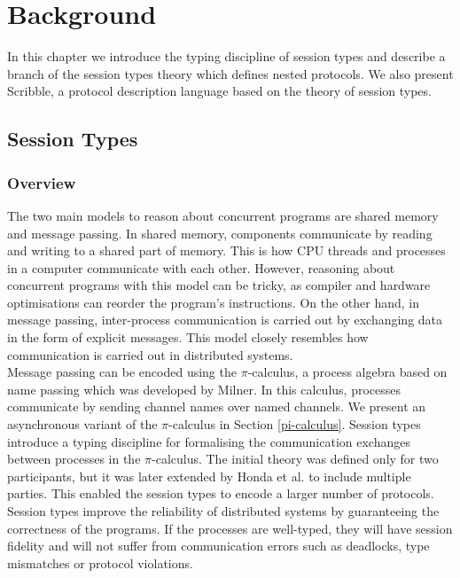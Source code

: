 \documentclass[12pt,twoside]{report}
\begin{document}

\chapter{Background}\label{background}

In this chapter we introduce the typing discipline of session types and describe a branch of the session types theory which defines nested protocols. We also present Scribble\cite{scribble}, a protocol description language based on the theory of session types.

\section{Session Types}
\subsection{Overview}

The two main models to reason about concurrent programs are shared memory and message passing. In shared memory, components communicate by reading and writing to a shared part of memory. This is how CPU threads and processes in a computer communicate with each other. However, reasoning about concurrent programs with this model can be tricky, as compiler and hardware optimisations can reorder the program's instructions\cite{sharedmemory}. On the other hand, in message passing, inter-process communication is carried out by exchanging data in the form of explicit messages. This model closely resembles how communication is carried out in distributed systems.\\

Message passing can be encoded using the $\pi$-calculus, a process algebra based on name passing which was developed by Milner\cite{milnerpicalc}. In this calculus, processes communicate by sending channel names over named channels. We present an asynchronous variant of the $\pi$-calculus in Section \ref{pi-calculus}. Session types\cite{binarysessiontypes1} introduce a typing discipline for formalising the communication exchanges between processes in the $\pi$-calculus. The initial theory was defined only for two participants, but it was later extended by Honda et al.\cite{asyncmpst1, asyncmpst2} to include multiple parties. This enabled the session types to encode a larger number of protocols. Session types improve the reliability of distributed systems by guaranteeing the correctness of the programs. If the processes are well-typed, they will have session fidelity and will not suffer from communication errors such as deadlocks, type mismatches or protocol violations.\\
\end{document}
